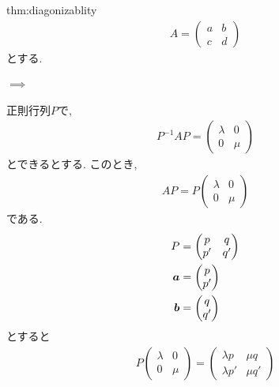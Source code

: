 \subsection{}
\begin{proofof}{thm:diagonizablity}
  \begin{align*}
    A=
    \begin{pmatrix}
      a &b\\c&d
    \end{pmatrix}
  \end{align*}
  とする.
  \paragraph{$\implies$}
  正則行列$P$で,
  \begin{align*}
    P^{-1}AP=
    \begin{pmatrix}
      \lambda&0\\0&\mu
    \end{pmatrix}
  \end{align*}
  とできるとする.
  このとき,
  \begin{align*}
    AP=
    P\begin{pmatrix}
      \lambda&0\\0&\mu
    \end{pmatrix}
  \end{align*}
  である.
  \begin{align*}
    P&=
    \begin{pmatrix}
      p&q\\p'&q'
    \end{pmatrix}\\
    \boldsymbol{a}&=
    \begin{pmatrix}
      p\\p'
    \end{pmatrix}\\
    \boldsymbol{b}&=
    \begin{pmatrix}
      q\\q'
    \end{pmatrix}
  \end{align*}
  とすると
  \begin{align*}
    P
    \begin{pmatrix}
      \lambda &0\\0&\mu
    \end{pmatrix}=
    \begin{pmatrix}
      \lambda p&\mu q\\ \lambda p'&\mu q'

\end{pmatrix}
\end{align*}
\end{proofof}

